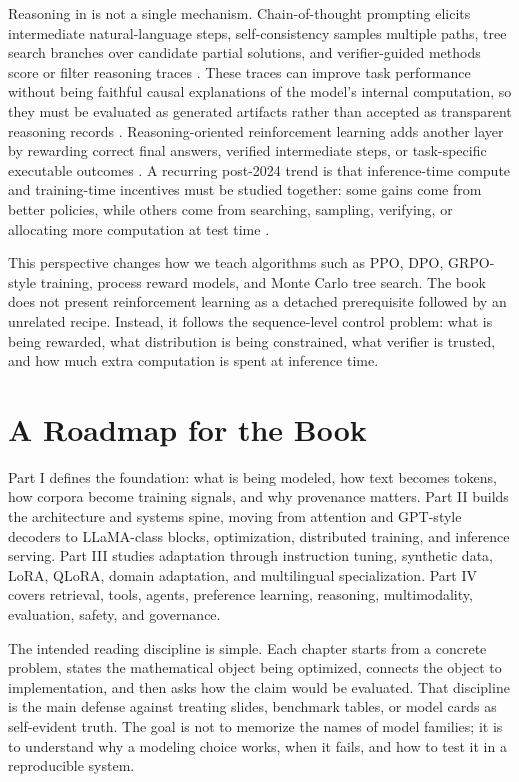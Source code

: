 Reasoning in \llms is not a single mechanism. Chain-of-thought prompting elicits intermediate natural-language steps, self-consistency samples multiple paths, tree search branches over candidate partial solutions, and verifier-guided methods score or filter reasoning traces \cite{wei2022chain,yao2023tree}. These traces can improve task performance without being faithful causal explanations of the model's internal computation, so they must be evaluated as generated artifacts rather than accepted as transparent reasoning records \cite{lyu2023faithful}. Reasoning-oriented reinforcement learning adds another layer by rewarding correct final answers, verified intermediate steps, or task-specific executable outcomes \cite{deepseek2025r1,wen2025rlvr}. A recurring post-2024 trend is that inference-time compute and training-time incentives must be studied together: some gains come from better policies, while others come from searching, sampling, verifying, or allocating more computation at test time \cite{chen2025reasoning,snell2024scaling,yang2025testtime}.

This perspective changes how we teach algorithms such as PPO, DPO, GRPO-style training, process reward models, and Monte Carlo tree search. The book does not present reinforcement learning as a detached prerequisite followed by an unrelated \rlhf recipe. Instead, it follows the sequence-level control problem: what is being rewarded, what distribution is being constrained, what verifier is trusted, and how much extra computation is spent at inference time.

\section{A Roadmap for the Book}
\label{sec:roadmap}

Part I defines the foundation: what is being modeled, how text becomes tokens, how corpora become training signals, and why provenance matters. Part II builds the architecture and systems spine, moving from attention and GPT-style decoders to LLaMA-class blocks, optimization, distributed training, and inference serving. Part III studies adaptation through instruction tuning, synthetic data, LoRA, QLoRA, domain adaptation, and multilingual specialization. Part IV covers retrieval, tools, agents, preference learning, reasoning, multimodality, evaluation, safety, and governance.

The intended reading discipline is simple. Each chapter starts from a concrete problem, states the mathematical object being optimized, connects the object to implementation, and then asks how the claim would be evaluated. That discipline is the main defense against treating slides, benchmark tables, or model cards as self-evident truth. The goal is not to memorize the names of model families; it is to understand why a modeling choice works, when it fails, and how to test it in a reproducible system.

